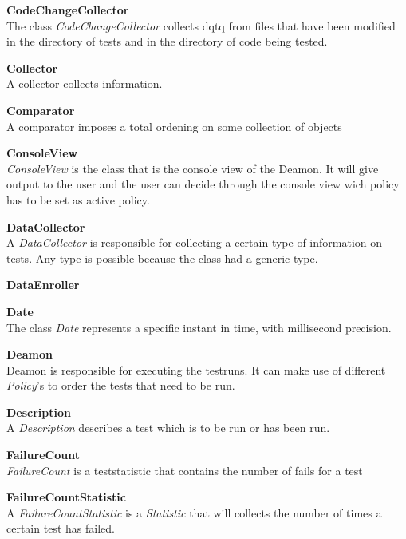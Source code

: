 \documentclass[i2]{oss}
\newcommand{\class}[1]{\emph{#1}}
\newcommand{\gloss}[1]{\textbf{#1}}
\begin{document}
\begin{description}
\item \gloss{CodeChangeCollector}\\
The class \class{CodeChangeCollector} collects dqtq from files that have been modified in the directory of tests and in the directory of code being tested. 
	

\item \gloss{Collector}\\
A collector collects information.

\item \gloss{Comparator}\\
A comparator imposes a total ordening on some collection of objects

\item \gloss{ConsoleView}\\
\class{ConsoleView} is the class that is the console view of the Deamon. It will give output to the user and the user can decide through the console view wich policy has to be set as active policy.

\item \gloss{DataCollector}\\
A \class{DataCollector} is responsible for collecting a certain type of information on tests. Any type is possible because the class had a generic type.

\item \gloss{DataEnroller}\\

\item \gloss{Date}\\
The class \class{Date} represents a specific instant in time, with millisecond precision.

\item \gloss{Deamon} \\
	Deamon is responsible for executing the testruns. It can make use of different \class{Policy}'s to order the tests that need to be run.

\item \gloss{Description} \\ A \class{Description} describes a test which is to be run or has been run. 

\item \gloss{FailureCount} \\ 
\class{FailureCount} is a teststatistic that contains the number of fails for a test

\item \gloss{FailureCountStatistic}\\
A \class{FailureCountStatistic} is a \class{Statistic} that will collects the number of times a certain test has failed.


\end{description}
\end{document}
